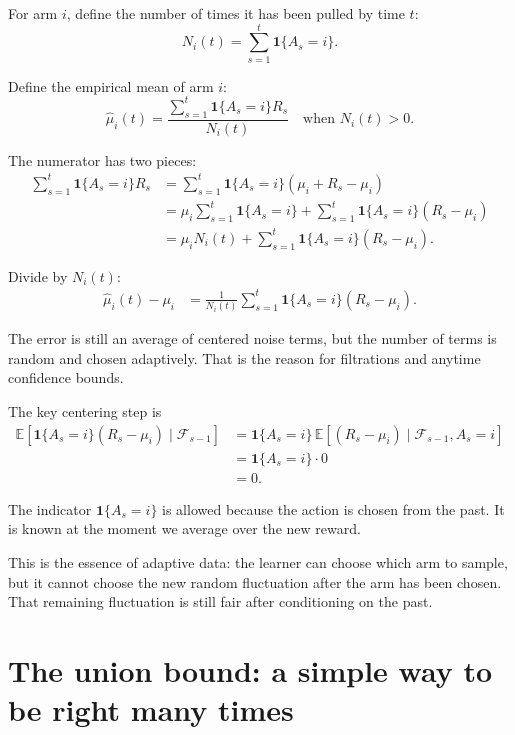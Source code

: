 \documentclass[en,nofont,11pt]{elegantbook}
\newcommand{\E}{\mathbb{E}}
\newcommand{\F}{\mathcal{F}}
\newcommand{\one}{\mathbf{1}}
\begin{document}
For arm $i$, define the number of times it has been pulled by time $t$:
\begin{equation}
N_i(t)=\sum_{s=1}^t \one\{A_s=i\}.
\end{equation}

Define the empirical mean of arm $i$:
\begin{equation}
\widehat\mu_i(t)=
\frac{\sum_{s=1}^t \one\{A_s=i\}R_s}{N_i(t)}
\quad\text{when }N_i(t)>0.
\end{equation}

The numerator has two pieces:
\begin{align}
\sum_{s=1}^t \one\{A_s=i\}R_s
&= \sum_{s=1}^t \one\{A_s=i\}(\mu_i + R_s-\mu_i) \\
&= \mu_i\sum_{s=1}^t \one\{A_s=i\}
+ \sum_{s=1}^t \one\{A_s=i\}(R_s-\mu_i) \\
&= \mu_i N_i(t)
+ \sum_{s=1}^t \one\{A_s=i\}(R_s-\mu_i).
\end{align}

Divide by $N_i(t)$:
\begin{align}
\widehat\mu_i(t)-\mu_i
&=
\frac{1}{N_i(t)}
\sum_{s=1}^t \one\{A_s=i\}(R_s-\mu_i). \label{eq:adaptive_empirical_error}
\end{align}

The error is still an average of centered noise terms, but the number of terms is random and chosen adaptively.  That is the reason for filtrations and anytime confidence bounds.

The key centering step is
\begin{align}
\E\left[\one\{A_s=i\}(R_s-\mu_i)\mid \F_{s-1}\right]
&= \one\{A_s=i\}\,\E\left[(R_s-\mu_i)\mid \F_{s-1},A_s=i\right] \\
&= \one\{A_s=i\}\cdot 0 \\
&= 0. \label{eq:adaptive_centering}
\end{align}

The indicator $\one\{A_s=i\}$ is allowed because the action is chosen from the past.  It is known at the moment we average over the new reward.

\begin{thinkbox}
This is the essence of adaptive data: the learner can choose which arm to sample, but it cannot choose the new random fluctuation after the arm has been chosen.  That remaining fluctuation is still fair after conditioning on the past.
\end{thinkbox}

\chapter{The union bound: a simple way to be right many times}
\end{document}

